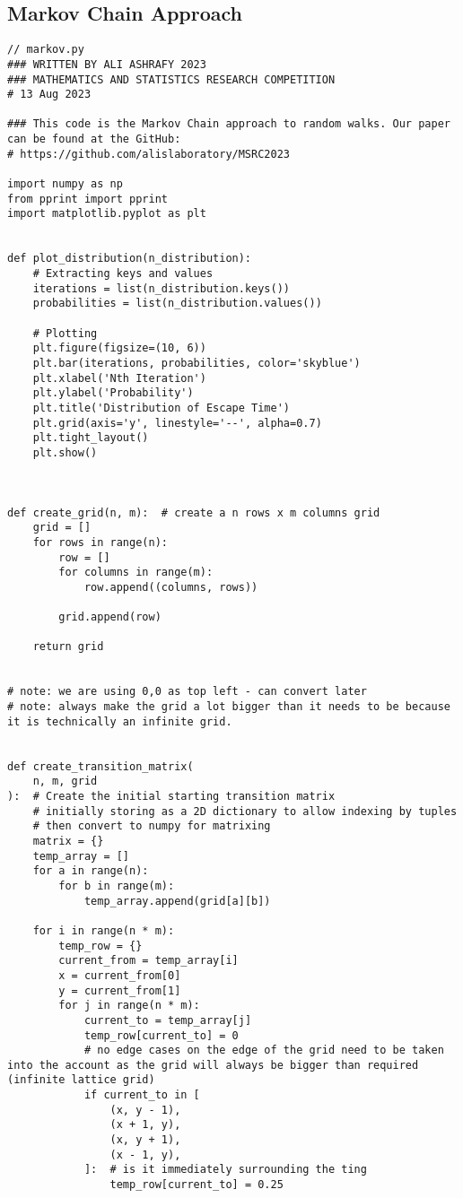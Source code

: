 \documentclass[12pt,a4paper]{article}
\begin{document}
\subsection{Markov Chain Approach}
\begin{lstlisting}
// markov.py
### WRITTEN BY ALI ASHRAFY 2023
### MATHEMATICS AND STATISTICS RESEARCH COMPETITION
# 13 Aug 2023

### This code is the Markov Chain approach to random walks. Our paper can be found at the GitHub:
# https://github.com/alislaboratory/MSRC2023

import numpy as np
from pprint import pprint
import matplotlib.pyplot as plt


def plot_distribution(n_distribution):
    # Extracting keys and values
    iterations = list(n_distribution.keys())
    probabilities = list(n_distribution.values())
    
    # Plotting
    plt.figure(figsize=(10, 6))
    plt.bar(iterations, probabilities, color='skyblue')
    plt.xlabel('Nth Iteration')
    plt.ylabel('Probability')
    plt.title('Distribution of Escape Time')
    plt.grid(axis='y', linestyle='--', alpha=0.7)
    plt.tight_layout()
    plt.show()



def create_grid(n, m):  # create a n rows x m columns grid
    grid = []
    for rows in range(n):
        row = []
        for columns in range(m):
            row.append((columns, rows))

        grid.append(row)

    return grid


# note: we are using 0,0 as top left - can convert later
# note: always make the grid a lot bigger than it needs to be because it is technically an infinite grid.


def create_transition_matrix(
    n, m, grid
):  # Create the initial starting transition matrix
    # initially storing as a 2D dictionary to allow indexing by tuples
    # then convert to numpy for matrixing
    matrix = {}
    temp_array = []
    for a in range(n):
        for b in range(m):
            temp_array.append(grid[a][b])

    for i in range(n * m):
        temp_row = {}
        current_from = temp_array[i]
        x = current_from[0]
        y = current_from[1]
        for j in range(n * m):
            current_to = temp_array[j]
            temp_row[current_to] = 0
            # no edge cases on the edge of the grid need to be taken into the account as the grid will always be bigger than required (infinite lattice grid)
            if current_to in [
                (x, y - 1),
                (x + 1, y),
                (x, y + 1),
                (x - 1, y),
            ]:  # is it immediately surrounding the ting
                temp_row[current_to] = 0.25


\end{lstlisting}
\end{document}
